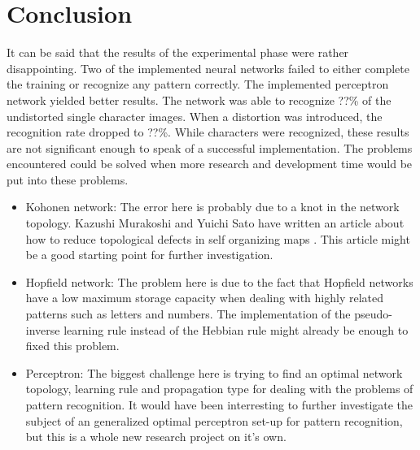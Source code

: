 \documentclass[pdftex,a4paper,12pt,twoside]{report}
\theoremstyle{plain} \newtheorem{theorem}{Theorem} \newtheorem{proposition}{Proposition} \newtheorem{lemma}{Lemma} \newtheorem*{corollary}{Corollary}
\theoremstyle{definition} \newtheorem{definition}{Definition} \newtheorem{conjecture}{Conjecture} \newtheorem*{example}{Example} \newtheorem{algorithm}{Algorithm}
\theoremstyle{remark} \newtheorem*{remark}{Remark} \newtheorem*{note}{Note} \newtheorem{case}{Case}
\begin{document}
\chapter{Conclusion}
\label{ch:conclusie}
It can be said that the results of the experimental phase were rather disappointing. Two of the implemented neural networks failed to either complete the training or recognize any pattern correctly. The implemented perceptron network yielded better results. The network was able to recognize ??\% of the undistorted single character images.  When a distortion was introduced, the recognition rate dropped to ??\%. While characters were recognized, these results are not significant enough to speak of a successful implementation. The problems encountered could be solved when more research and development time would be put into these problems.
\begin{itemize}
\item Kohonen network: The error here is probably due to a knot in the network topology. Kazushi Murakoshi and Yuichi Sato have written an article about how to reduce topological defects in self organizing maps \citep{Murakoshi2006}. This article might be a good starting point for further investigation.
\item Hopfield network: The problem here is due to the fact that Hopfield networks have a low maximum storage capacity when dealing with highly related patterns such as letters and numbers. The implementation of the pseudo-inverse learning rule instead of the Hebbian rule might already be enough to fixed this problem.
\item Perceptron: The biggest challenge here is trying to find an optimal network topology, learning rule and propagation type for dealing with the problems of pattern recognition. It would have been interresting to further investigate the subject of an generalized optimal perceptron set-up for pattern recognition, but this is a whole new research project on it's own.
\end{itemize}
\end{document}
